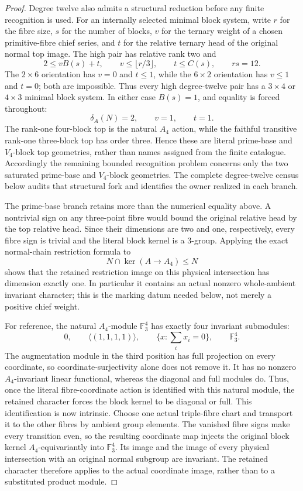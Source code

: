 \begin{proof}
Degree twelve also admits a structural reduction before any finite
recognition is used.  For an internally selected minimal block system,
write $r$ for the fibre size, $s$ for the number of blocks, $v$ for the
ternary weight of a chosen primitive-fibre chief series, and $t$ for the
relative ternary head of the original normal top image.  The high pair has
relative rank two and
\[
  2\leq vB(s)+t,
  \qquad v\leq\lfloor r/3\rfloor,
  \qquad t\leq C(s),
  \qquad rs=12.
\]
The $2\times6$ orientation has $v=0$ and $t\leq1$, while the
$6\times2$ orientation has $v\leq1$ and $t=0$; both are impossible.
Thus every high degree-twelve pair has a $3\times4$ or $4\times3$
minimal block system.  In either case $B(s)=1$, and equality is forced
throughout:
\[
  \delta_A(N)=2,\qquad v=1,\qquad t=1.
\]
The rank-one four-block top is the natural $A_4$ action, while the
faithful transitive rank-one three-block top has order three.  Hence these
are literal prime-base and $V_4$-block top geometries, rather than names
assigned from the finite catalogue.
Accordingly the remaining bounded recognition problem concerns only the
two saturated prime-base and $V_4$-block geometries.  The complete
degree-twelve census below audits that structural fork and identifies the
owner realized in each branch.

The prime-base branch retains more than the numerical equality above.
A nontrivial sign on any three-point fibre would bound the original
relative head by the top relative head.  Since their dimensions are two
and one, respectively, every fibre sign is trivial and the literal block
kernel is a $3$-group.  Applying the exact normal-chain restriction formula
to
\[
  N\cap\ker(A\longrightarrow A_4)\leq N
\]
shows that the retained restriction image on this physical intersection
has dimension exactly one.  In particular it contains an actual nonzero
whole-ambient invariant character; this is the marking datum needed below,
not merely a positive chief weight.

For reference, the natural $A_4$-module $\mathbb F_3^4$ has exactly four
invariant submodules:
\[
  0,\qquad
  \langle(1,1,1,1)\rangle,\qquad
  \{x:\textstyle\sum_i x_i=0\},\qquad
  \mathbb F_3^4.
\]
The augmentation module in the third position has full projection on every
coordinate, so coordinate-surjectivity alone does not remove it.  It has no
nonzero $A_4$-invariant linear functional, whereas the diagonal and full
modules do.  Thus, once the literal fibre-coordinate action is identified
with this natural module, the retained character forces the block kernel to
be diagonal or full.  This identification is now intrinsic.  Choose one
actual triple-fibre chart and transport it to the other fibres by ambient
group elements.  The vanished fibre signs make every transition even, so
the resulting coordinate map injects the original block kernel
$A_4$-equivariantly into $\mathbb F_3^4$.  Its image and the image of every
physical intersection with an original normal subgroup are invariant.  The
retained character therefore applies to the actual coordinate image, rather
than to a substituted product module.


\end{proof}
